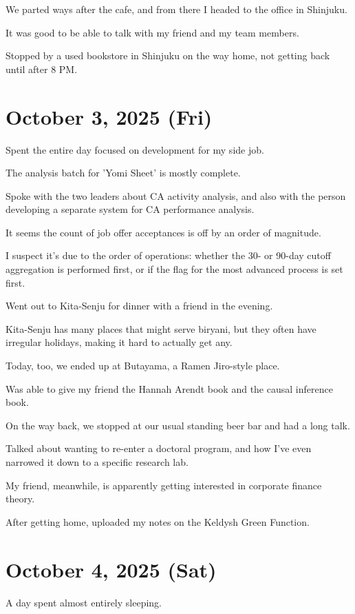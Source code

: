 \documentclass[uplatex]{jsarticle}
\begin{document}
We parted ways after the cafe, and from there I headed to the office in Shinjuku.

It was good to be able to talk with my friend and my team members.

Stopped by a used bookstore in Shinjuku on the way home, not getting back until after 8 PM.

\section{October 3, 2025 (Fri)}

Spent the entire day focused on development for my side job.

The analysis batch for 'Yomi Sheet' is mostly complete.

Spoke with the two leaders about CA activity analysis, and also with the person developing a separate system for CA performance analysis.

It seems the count of job offer acceptances is off by an order of magnitude.

I suspect it's due to the order of operations: whether the 30- or 90-day cutoff aggregation is performed first, or if the flag for the most advanced process is set first.

Went out to Kita-Senju for dinner with a friend in the evening.

Kita-Senju has many places that might serve biryani, but they often have irregular holidays, making it hard to actually get any.

Today, too, we ended up at Butayama, a Ramen Jiro-style place.

Was able to give my friend the Hannah Arendt book and the causal inference book.

On the way back, we stopped at our usual standing beer bar and had a long talk.

Talked about wanting to re-enter a doctoral program, and how I've even narrowed it down to a specific research lab.

My friend, meanwhile, is apparently getting interested in corporate finance theory.

After getting home, uploaded my notes on the Keldysh Green Function.

\section{October 4, 2025 (Sat)}

A day spent almost entirely sleeping.
\end{document}
